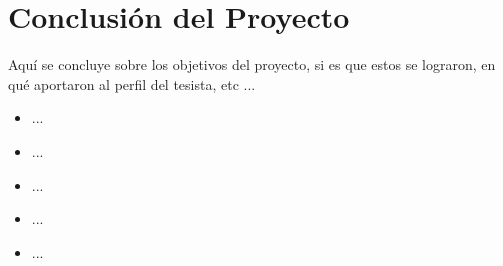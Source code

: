 \chapter{Conclusión del Proyecto}
Aquí se concluye sobre los objetivos del proyecto, si es que estos se lograron, en qué aportaron al perfil del tesista, etc ...

\begin{itemize}
	\item ...
	\item ...
	\item ...
	\item ...
	\item ...
\end{itemize}
